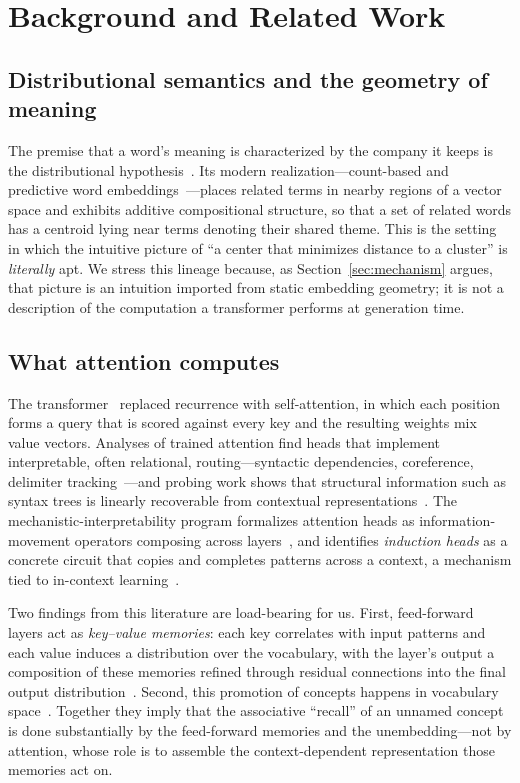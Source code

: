 \documentclass[conference]{IEEEtran}
\theoremstyle{definition}
\begin{document}
\section{Background and Related Work}
\label{sec:related}

\subsection{Distributional semantics and the geometry of meaning}
The premise that a word's meaning is characterized by the company it keeps is the distributional hypothesis~\cite{harris1954,firth1957}. Its modern realization---count-based and predictive word embeddings~\cite{glove,levygoldberg}---places related terms in nearby regions of a vector space and exhibits additive compositional structure, so that a set of related words has a centroid lying near terms denoting their shared theme. This is the setting in which the intuitive picture of ``a center that minimizes distance to a cluster'' is \emph{literally} apt. We stress this lineage because, as Section~\ref{sec:mechanism} argues, that picture is an intuition imported from static embedding geometry; it is not a description of the computation a transformer performs at generation time.

\subsection{What attention computes}
The transformer~\cite{vaswani2017} replaced recurrence with self-attention, in which each position forms a query that is scored against every key and the resulting weights mix value vectors. Analyses of trained attention find heads that implement interpretable, often relational, routing---syntactic dependencies, coreference, delimiter tracking~\cite{clark2019bert}---and probing work shows that structural information such as syntax trees is linearly recoverable from contextual representations~\cite{hewitt2019}. The mechanistic-interpretability program formalizes attention heads as information-movement operators composing across layers~\cite{elhage2021framework}, and identifies \emph{induction heads} as a concrete circuit that copies and completes patterns across a context, a mechanism tied to in-context learning~\cite{olsson2022induction}.

Two findings from this literature are load-bearing for us. First, feed-forward layers act as \emph{key--value memories}: each key correlates with input patterns and each value induces a distribution over the vocabulary, with the layer's output a composition of these memories refined through residual connections into the final output distribution~\cite{geva2021kv}. Second, this promotion of concepts happens in vocabulary space~\cite{geva2022promote}. Together they imply that the associative ``recall'' of an unnamed concept is done substantially by the feed-forward memories and the unembedding---not by attention, whose role is to assemble the context-dependent representation those memories act on.
\end{document}
